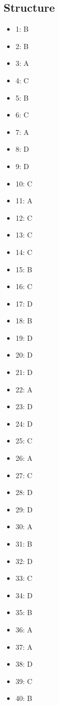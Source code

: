 \documentclass[12pt]{article}
\begin{document}
\subsection*{Structure}
\begin{itemize}[leftmargin=*]
\item 1: B
\item 2: B
\item 3: A
\item 4: C
\item 5: B
\item 6: C
\item 7: A
\item 8: D
\item 9: D
\item 10: C
\item 11: A
\item 12: C
\item 13: C
\item 14: C
\item 15: B
\item 16: C
\item 17: D
\item 18: B
\item 19: D
\item 20: D
\item 21: D
\item 22: A
\item 23: D
\item 24: D
\item 25: C
\item 26: A
\item 27: C
\item 28: D
\item 29: D
\item 30: A
\item 31: B
\item 32: D
\item 33: C
\item 34: D
\item 35: B
\item 36: A
\item 37: A
\item 38: D
\item 39: C
\item 40: B
\end{itemize}
\end{document}
